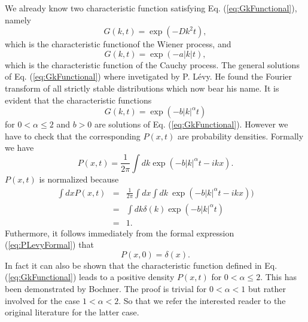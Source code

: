 We already know two characteristic function satisfying Eq. 
(\ref{eq:GkFunctional}), namely
\begin{displaymath}
  G(k,t) = \exp(-D k^2 t),
\end{displaymath}
which is the characteristic functionof the Wiener process, and
\begin{displaymath}
  G(k,t) = \exp(-a |k| t),
\end{displaymath}
which is the characteristic function of the Cauchy process.
The general solutions of Eq. (\ref{eq:GkFunctional}) where invetigated by
P. L\'evy.   He found the Fourier transform of all strictly stable 
distributions which now bear his name. It is evident that the
characteristic functions
\begin{displaymath}
  G(k,t) = \exp(-b |k|^\alpha t)
\end{displaymath}
for $0 < \alpha \le 2$ and $b>0$ are solutions of
Eq. (\ref{eq:GkFunctional}). However we have to check that the corresponding
$P(x,t)$ are probability densities. Formally we have
\begin{equation}
\label{eq:PLevyFormal}
  P(x,t) = \frac{1}{2 \pi}  \int dk \exp(- b |k|^{\alpha} t -ikx).
\end{equation}
$P(x,t)$ is normalized because
\begin{eqnarray*}
  \int dx P(x,t) &=& \frac{1}{2 \pi} \int dx \int dk \
              \exp(-b|k|^{\alpha} t - ikx)) \\
                 & = & \int dk \delta(k) \exp(- b |k|^{\alpha} t) \\
                 & = & 1.
\end{eqnarray*}
Futhermore, it follows  immediately from the formal expression 
(\ref{eq:PLevyFormal}) that
\begin{displaymath}
  P(x,0) = \delta(x).
\end{displaymath}
In fact it can also be shown that the characteristic function defined in Eq. 
(\ref{eq:GkFunctional}) leads to a positive density $P(x,t)$ for
$0 < \alpha \le 2$.
This has been demonstrated by Bochner. The proof is trivial for $0 < \alpha
<1$ but rather involved for the case $1 < \alpha <2$. So that we refer the
interested reader to the original literature for the latter case. 

